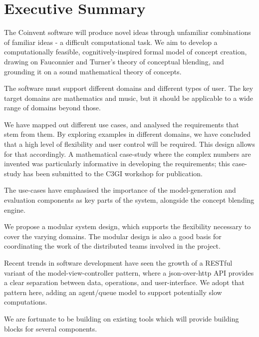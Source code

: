 \section*{Executive Summary}
\thispagestyle{empty}
\addtolength{\parskip}{\baselineskip}

The Coinvent software will produce novel ideas through unfamiliar combinations of familiar ideas - a difficult computational task. We aim to develop a computationally feasible, cognitively-inspired formal model of concept creation, drawing on Fauconnier and Turner's theory of conceptual blending, and grounding it on a sound mathematical theory of concepts. 

The software must support different domains and different types of user. The key target domains are mathematics and music, but it should be applicable
to a wide range of domains beyond those.

We have mapped out different use cases, and analysed the requirements that stem from them.
By exploring examples in different domains, we have concluded that a high level of flexibility and user control will be required. This design allows for that accordingly. A mathematical case-study where the complex numbers are invented was particularly informative in developing the requirements; this case-study 
has been submitted to the C3GI workshop for publication.

The use-cases have emphasised the importance of the model-generation and evaluation components as key parts of the system, alongside the concept blending engine.

We propose a modular system design, which supports the flexibility necessary to cover the varying domains. The modular design is also a good basis for coordinating the work of the distributed teams involved in the project. 

Recent trends in software development have seen the growth of a RESTful variant of the model-view-controller pattern, where a json-over-http API provides a clear
separation between data, operations, and user-interface. We adopt that pattern here, adding an agent/queue model to support potentially slow computations.

We are fortunate to be building on existing tools which will provide building blocks for several components.

